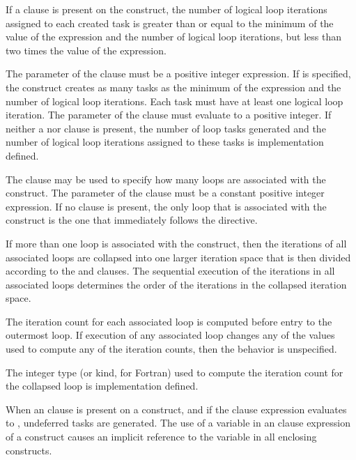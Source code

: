 If a  clause is present on the  construct, the number of logical loop iterations assigned to each created task is greater than or equal to the minimum of the value of the  expression and the number of logical loop iterations, but less than two times the value of the  expression.

The parameter of the  clause must be a positive integer expression.
If  is specified, the  construct creates as many tasks as the minimum of the  expression and the number of logical loop iterations.  
Each task must have at least one logical loop iteration.
The parameter of the  clause must evaluate to a positive integer.
If neither a  nor  clause is present, the number of loop tasks generated and the number of logical loop iterations assigned to these tasks is implementation defined.

The  clause may be used to specify how many loops are associated with the  construct. The parameter of the  clause must be a constant positive integer expression. If no  clause is present, the only loop that is associated with the  construct is the one that immediately follows the  directive.

If more than one loop is associated with the  construct, then the iterations of all associated loops are collapsed into one larger iteration space that is then divided according to the  and  clauses. The sequential execution of the iterations in all associated loops determines the order of the iterations in the collapsed iteration space. 

The iteration count for each associated loop is computed before entry to the outermost loop. If execution of any associated loop changes any of the values used to compute any of the iteration counts, then the behavior is unspecified. 

The integer type (or kind, for Fortran) used to compute the iteration count for the collapsed loop is implementation defined.

When an  clause is present on a  construct, and if the  clause expression evaluates to , undeferred tasks are generated. The use of a variable in an  clause expression of a  construct causes an implicit reference to the variable in all enclosing constructs.

